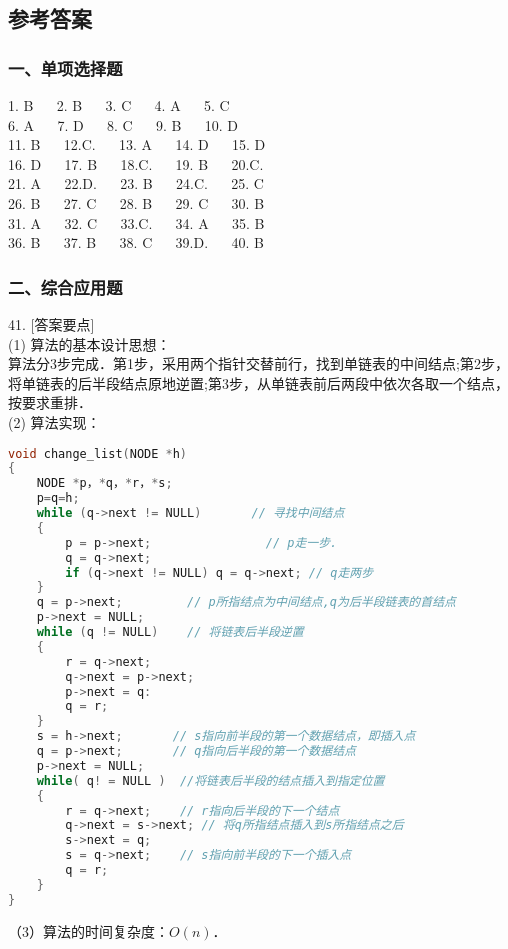 \subsection{参考答案}

\subsubsection{一、单项选择题}
1. B $\quad$ 2. B $\quad$ 3. C $\quad$ 4. A $\quad$ 5. C \\
6. A $\quad$ 7. D $\quad$ 8. C $\quad$ 9. B $\quad$ 10. D \\
11. B $\quad$ 12.C. $\quad$ 13. A $\quad$ 14. D $\quad$ 15. D \\
16. D $\quad$ 17. B $\quad$ 18.C. $\quad$ 19. B $\quad$ 20.C. \\
21. A $\quad$ 22.D. $\quad$ 23. B $\quad$ 24.C. $\quad$ 25. C \\
26. B $\quad$ 27. C $\quad$ 28. B $\quad$ 29. C $\quad$ 30. B \\
31. A $\quad$ 32. C $\quad$ 33.C. $\quad$ 34. A $\quad$ 35. B \\
36. B $\quad$ 37. B $\quad$ 38. C $\quad$ 39.D. $\quad$ 40. B \\

\subsubsection{二、综合应用题}
41. [答案要点] \\
(1) 算法的基本设计思想： \\
算法分3步完成．第1步，采用两个指针交替前行，找到单链表的中间结点;第2步，将单链表的后半段结点原地逆置;第3步，从单链表前后两段中依次各取一个结点，按要求重排． \\
(2) 算法实现：
\begin{lstlisting}[language=cpp]
void change_list(NODE *h)
{
    NODE *p，*q，*r，*s;
    p=q=h;
    while (q->next != NULL)       // 寻找中间结点
    {
        p = p->next;                // p走一步.
        q = q->next;
        if (q->next != NULL) q = q->next; // q走两步
    }
    q = p->next;         // p所指结点为中间结点,q为后半段链表的首结点
    p->next = NULL;
    while (q != NULL)    // 将链表后半段逆置
    {
        r = q->next;
        q->next = p->next;
        p->next = q:
        q = r;
    }
    s = h->next;       // s指向前半段的第一个数据结点，即插入点
    q = p->next;       // q指向后半段的第一个数据结点
    p->next = NULL;
    while( q! = NULL )  //将链表后半段的结点插入到指定位置
    {
        r = q->next;    // r指向后半段的下一个结点
        q->next = s->next; // 将q所指结点插入到s所指结点之后
        s->next = q;
        s = q->next;    // s指向前半段的下一个插入点
        q = r;
    }
}
\end{lstlisting}
（3）算法的时间复杂度：$O(n)$．


